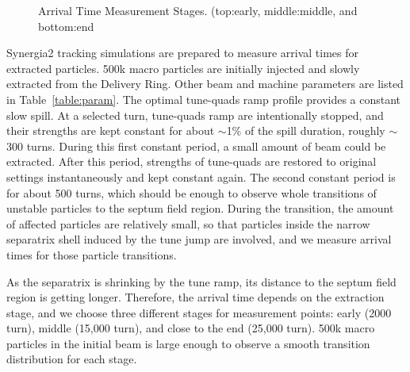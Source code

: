 \documentclass[aps,prstab,onecolumn,preprint]{revtex4-1}
\begin{document}
\begin{figure}[!tbp]
  \caption{\label{fig:arrival1}Arrival Time Measurement Stages. (top:early, middle:middle, and bottom:end}
\end{figure}

Synergia2 tracking simulations are prepared to measure arrival times for extracted particles. 500k macro particles are initially injected and slowly extracted from the Delivery Ring. Other beam and machine parameters are listed in Table~\ref{table:param}. The optimal tune-quads ramp profile provides a constant slow spill. At a selected turn, tune-quads ramp are intentionally stopped, and their strengths are kept constant for about $\sim$1\% of the spill duration, roughly $\sim$300 turns. During this first constant period, a small amount of beam could be extracted. After this period, strengths of tune-quads are restored to original settings instantaneously and kept constant again. The second constant period is for about 500 turns, which should be enough to observe whole transitions of unstable particles to the septum field region. During the transition, the amount of affected particles are relatively small, so that particles inside the narrow separatrix shell induced by the tune jump are involved, and we measure arrival times for those particle transitions. 

As the separatrix is shrinking by the tune ramp, its distance to the septum field region is getting longer. Therefore, the arrival time depends on the extraction stage, and we choose three different stages for measurement points: early (2000 turn), middle (15,000 turn), and close to the end (25,000 turn). 500k macro particles in the initial beam is large enough to observe a smooth transition distribution for each stage.
\end{document}
